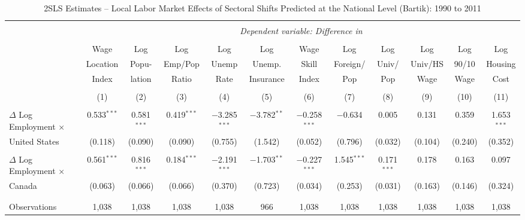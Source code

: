 

\begin{sidewaystable}[!htbp] \centering 
  \caption{2SLS Estimates -- Local Labor Market Effects of Sectoral Shifts Predicted at the National Level (Bartik):  1990 to 2011} 
  \label{tab:bartik_2sls} 
\small
\begin{threeparttable}
\begin{tabular}{@{\extracolsep{5pt}}lccccccccccc} 
\\[-1.8ex]\hline 
\hline \\[-1.8ex] 
 & \multicolumn{11}{c}{\textit{Dependent variable: Difference in }} \\ 
\cline{2-12} 
\\[-2.0ex]
 & Wage & Log & Log & Log & Log & Wage & Log & Log & Log & Log & Log \\
 & Location & Popu- & Emp/Pop & Unemp & Unemp. & Skill & Foreign/ & Univ/ & Univ/HS & 90/10 & Housing \\
 & Index & lation & Ratio & Rate & Insurance & Index & Pop & Pop & Wage & Wage & Cost \\
\\[-1.8ex] & (1) & (2) & (3) & (4) & (5) & (6) & (7) & (8) & (9) & (10) & (11)\\ 
\hline \\[-1.8ex] 
 $\Delta$ Log Employment $\times$ & 0.533$^{***}$ & 0.581$^{***}$ & 0.419$^{***}$ & $-$3.285$^{***}$ & $-$3.782$^{**}$ & $-$0.258$^{***}$ & $-$0.634 & 0.005 & 0.131 & 0.359 & 1.653$^{***}$ \\ 
United States  & (0.118) & (0.090) & (0.090) & (0.755) & (1.542) & (0.052) & (0.796) & (0.032) & (0.104) & (0.240) & (0.352) \\ 
  & & & & & & & & & & & \\ 
 $\Delta$ Log Employment $\times$ & 0.561$^{***}$ & 0.816$^{***}$ & 0.184$^{***}$ & $-$2.191$^{***}$ & $-$1.703$^{**}$ & $-$0.227$^{***}$ & 1.545$^{***}$ & 0.171$^{***}$ & 0.178 & 0.163 & 0.097 \\ 
Canada  & (0.063) & (0.066) & (0.066) & (0.370) & (0.723) & (0.034) & (0.253) & (0.031) & (0.163) & (0.146) & (0.324) \\ 
  & & & & & & & & & & & \\ 
\hline \\[-1.8ex] 
Observations & 1,038 & 1,038 & 1,038 & 1,038 & 966 & 1,038 & 1,038 & 1,038 & 1,038 & 1,038 & 1,038 \\ 

\end{tabular}
\end{threeparttable}
\end{sidewaystable}
